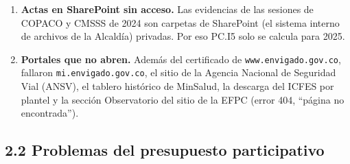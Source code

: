 \documentclass[11pt,letterpaper]{article}
\begin{document}
\begin{enumerate}
\item \textbf{Actas en SharePoint sin acceso.} Las evidencias de las sesiones de COPACO y CMSSS de 2024 son carpetas de SharePoint (el sistema interno de archivos de la Alcaldía) privadas. Por eso PC.I5 solo se calcula para 2025.
\item \textbf{Portales que no abren.} Además del certificado de \texttt{\footnotesize www.\allowbreak{}envigado.\allowbreak{}gov.\allowbreak{}co}, fallaron \texttt{\footnotesize mi.\allowbreak{}envigado.\allowbreak{}gov.\allowbreak{}co}, el sitio de la Agencia Nacional de Seguridad Vial (ANSV), el tablero histórico de MinSalud, la descarga del ICFES por plantel y la sección Observatorio del sitio de la EFPC (error 404, ``página no encontrada'').
\end{enumerate}

\subsection*{2.2 Problemas del presupuesto participativo}

\end{document}
